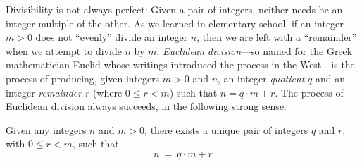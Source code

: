 Divisibility is not always perfect: Given a pair of integers, neither needs be an integer multiple of the other.  As we learned in elementary school, if an integer $m > 0$ does not ``evenly'' divide an integer $n$, then we are left with a ``remainder'' when we attempt to divide $n$ by $m$.  {\it Euclidean} {\it division}---so named for the Greek mathematician Euclid whose writings introduced the process in the West---is the process of producing, given integers $m >0$ and $n$, an integer {\it quotient} $q$ and an integer {\it remainder} $r$ (where $0 \leq r < m$) such that $n = q \cdot m + r$.  The process of Euclidean division always succeeds, in the following strong sense.

\begin{theorem}
\label{thm:division-thm}
Given any integers $n$ and $m > 0$, there exists a unique pair of integers $q$ and $r$, with $0 \leq r < m$, such that
\begin{equation}
\label{eq:euclid-division}
n \ = \ q \cdot m + r
\end{equation}
\end{theorem}

